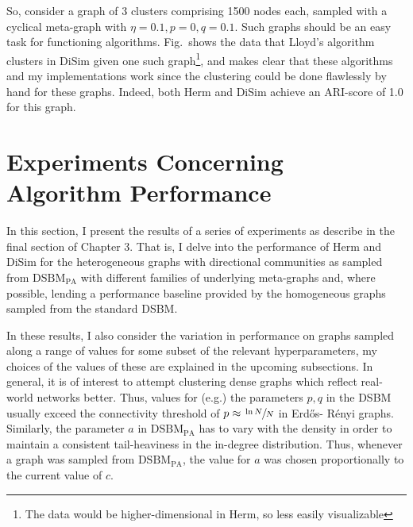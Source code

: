 
So, consider a graph of 3 clusters comprising 1500 nodes each, sampled with a cyclical meta-graph
with $\eta=0.1, p=0, q=0.1$. Such graphs should be an easy task for functioning algorithms. Fig.\ 
shows the data that Lloyd's algorithm clusters in DiSim given one such graph\footnote{The data 
would be higher-dimensional in Herm, so less easily visualizable}, and makes clear that these 
algorithms and my implementations work since the clustering could be done flawlessly by hand for 
these graphs. Indeed, both Herm and DiSim achieve an ARI-score of 1.0 for this graph.

\section{Experiments Concerning Algorithm Performance}

In this section, I present the results of a series of experiments as describe in the final section 
of Chapter 3. That is, I delve into the performance of Herm and DiSim for the heterogeneous graphs 
with directional communities as sampled from $\mathrm{DSBM}_\mathrm{PA}$ with different families 
of underlying meta-graphs and, where possible, lending a performance baseline provided by the 
homogeneous graphs sampled from the standard DSBM.

In these results, I also consider the variation in performance on graphs sampled along a range of 
values for some subset of the relevant hyperparameters, my choices of the values of these are 
explained in the upcoming subsections. In general, it is of interest to attempt clustering dense 
graphs which reflect real-world networks better. Thus, values for (e.g.) the parameters $p, q$ in 
the DSBM usually exceed the connectivity threshold of $p \approx \sfrac {\ln N} N$ in Erd\H{o}s-%
R\'enyi graphs. Similarly, the parameter $a$ in $\mathrm{DSBM}_\mathrm{PA}$ has to vary with the 
density in order to maintain a consistent tail-heaviness in the in-degree distribution. Thus, 
whenever a graph was sampled from $\mathrm{DSBM}_\mathrm{PA}$, the value for $a$ was chosen 
proportionally to the current value of $c$.

